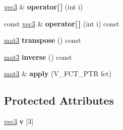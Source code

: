 \begin{DoxyCompactItemize}
\item 
\hypertarget{classmat3_ae44b2c7da5e1d0fa87b30d7d00f4e4f3}{
\hyperlink{classvec3}{vec3} \& {\bfseries operator\mbox{[}$\,$\mbox{]}} (int i)}
\label{classmat3_ae44b2c7da5e1d0fa87b30d7d00f4e4f3}

\item 
\hypertarget{classmat3_a5347c8208eb43b251b6bd779af3da963}{
const \hyperlink{classvec3}{vec3} \& {\bfseries operator\mbox{[}$\,$\mbox{]}} (int i) const }
\label{classmat3_a5347c8208eb43b251b6bd779af3da963}

\item 
\hypertarget{classmat3_a37e0d98b86201148018d5f6ebefed605}{
\hyperlink{classmat3}{mat3} {\bfseries transpose} () const }
\label{classmat3_a37e0d98b86201148018d5f6ebefed605}

\item 
\hypertarget{classmat3_a4668ed7cda236044eaa7a4d77f569432}{
\hyperlink{classmat3}{mat3} {\bfseries inverse} () const }
\label{classmat3_a4668ed7cda236044eaa7a4d77f569432}

\item 
\hypertarget{classmat3_af9bebf7319a26dd99cf7cdb9212e419f}{
\hyperlink{classmat3}{mat3} \& {\bfseries apply} (V\_\-FCT\_\-PTR fct)}
\label{classmat3_af9bebf7319a26dd99cf7cdb9212e419f}

\end{DoxyCompactItemize}
\subsection*{Protected Attributes}
\begin{DoxyCompactItemize}
\item 
\hypertarget{classmat3_a6ea9325bd4f99b8bf81868b87f626b6b}{
\hyperlink{classvec3}{vec3} {\bfseries v} \mbox{[}3\mbox{]}}
\label{classmat3_a6ea9325bd4f99b8bf81868b87f626b6b}

\end{DoxyCompactItemize}
